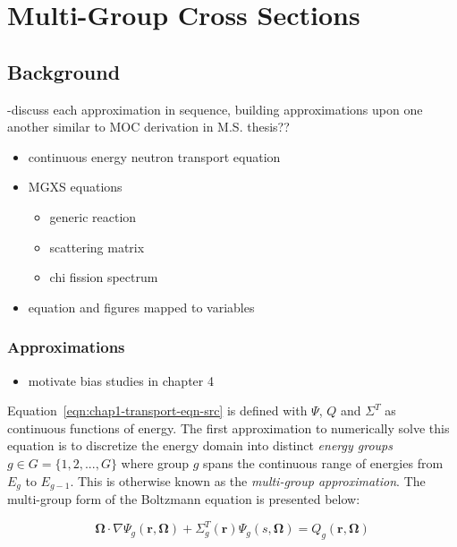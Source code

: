 \chapter{Multi-Group Cross Sections}
\label{chap:mgxs}

\section{Background}
\label{sec:chap2-background}

-discuss each approximation in sequence, building approximations upon one another similar to \ac{MOC} derivation in M.S. thesis??

\begin{itemize}[noitemsep]
  \item continuous energy neutron transport equation
  \item \ac{MGXS} equations
  \begin{itemize}[noitemsep]
    \item generic reaction
    \item scattering matrix
    \item chi fission spectrum
  \end{itemize}
  \item equation and figures mapped to variables
\end{itemize}


\subsection{Approximations}
\label{subsec:chap2-approx}

\begin{itemize}
  \item motivate bias studies in chapter 4
\end{itemize}

Equation~\ref{eqn:chap1-transport-eqn-src} is defined with $\Psi$, $Q$ and $\Sigma^T$ as continuous functions of energy. The first approximation to numerically solve this equation is to discretize the energy domain into distinct \textit{energy groups} $g \in G = \{1, 2, ..., G\}$ where group $g$ spans the continuous range of energies from $E_{g}$ to $E_{g-1}$. This is otherwise known as the \textit{multi-group approximation}. The multi-group form of the Boltzmann equation is presented below:

\begin{equation}
\label{eqn:chap2-transport-eqn-mg}
\mathbf{\Omega} \cdot \nabla \Psi_g(\mathbf{r},\mathbf{\mathbf{\Omega}}) + \Sigma^T_{g}(\mathbf{r})\Psi_g(s,\mathbf{\Omega}) = Q_g(\mathbf{r},\mathbf{\Omega})
\end{equation}

